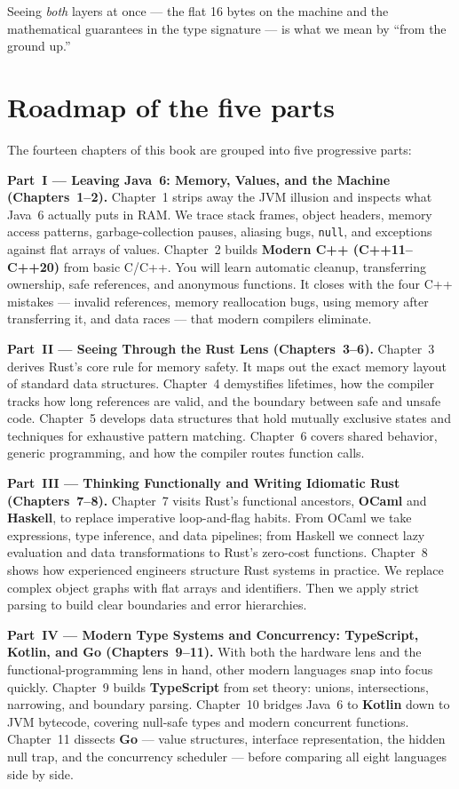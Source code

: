 Seeing \emph{both} layers at once --- the flat 16 bytes on the machine and the mathematical guarantees in the type signature --- is what we mean by ``from the ground up.''

\section*{Roadmap of the five parts}

The fourteen chapters of this book are grouped into five progressive parts:

\textbf{Part~I --- Leaving Java~6: Memory, Values, and the Machine (Chapters~1--2).}
Chapter~1 strips away the JVM illusion and inspects what Java~6 actually puts in RAM. We trace stack frames, object headers, memory access patterns, garbage-collection pauses, aliasing bugs, \texttt{null}, and exceptions against flat arrays of values. Chapter~2 builds \textbf{Modern C++ (C++11--C++20)} from basic C/C++. You will learn automatic cleanup, transferring ownership, safe references, and anonymous functions. It closes with the four C++ mistakes --- invalid references, memory reallocation bugs, using memory after transferring it, and data races --- that modern compilers eliminate.

\textbf{Part~II --- Seeing Through the Rust Lens (Chapters~3--6).}
Chapter~3 derives Rust's core rule for memory safety. It maps out the exact memory layout of standard data structures. Chapter~4 demystifies lifetimes, how the compiler tracks how long references are valid, and the boundary between safe and unsafe code. Chapter~5 develops data structures that hold mutually exclusive states and techniques for exhaustive pattern matching. Chapter~6 covers shared behavior, generic programming, and how the compiler routes function calls.

\textbf{Part~III --- Thinking Functionally and Writing Idiomatic Rust (Chapters~7--8).}
Chapter~7 visits Rust's functional ancestors, \textbf{OCaml} and \textbf{Haskell}, to replace imperative loop-and-flag habits. From OCaml we take expressions, type inference, and data pipelines; from Haskell we connect lazy evaluation and data transformations to Rust's zero-cost functions. Chapter~8 shows how experienced engineers structure Rust systems in practice. We replace complex object graphs with flat arrays and identifiers. Then we apply strict parsing to build clear boundaries and error hierarchies.

\textbf{Part~IV --- Modern Type Systems and Concurrency: TypeScript, Kotlin, and Go (Chapters~9--11).}
With both the hardware lens and the functional-programming lens in hand, other modern languages snap into focus quickly. Chapter~9 builds \textbf{TypeScript} from set theory: unions, intersections, narrowing, and boundary parsing. Chapter~10 bridges Java~6 to \textbf{Kotlin} down to JVM bytecode, covering null-safe types and modern concurrent functions. Chapter~11 dissects \textbf{Go} --- value structures, interface representation, the hidden null trap, and the concurrency scheduler --- before comparing all eight languages side by side.

